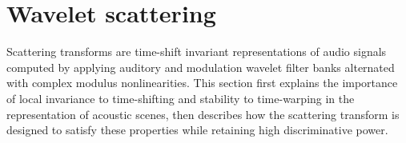 \documentclass[smallextended]{svjour3}
\newcommand{\gl}[1]{\textcolor{red}{Gr\'egoire : #1}}
\newcommand{\ja}[1]{\textcolor{magenta}{Joakim : #1}}
\newcommand{\ml}[1]{\textcolor{blue}{ Mathieu : #1}}
\begin{document}







\section{Wavelet scattering \label{sec:scattering}}

Scattering transforms are time-shift invariant representations of audio signals computed by applying auditory and modulation wavelet filter banks alternated with complex modulus nonlinearities.
This section first explains the importance of local invariance to time-shifting and stability to time-warping in the representation of acoustic scenes, then describes how the scattering transform is designed to satisfy these properties while retaining high discriminative power.
\end{document}
